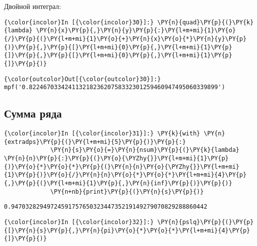 Двойной интеграл:

    \begin{Verbatim}[commandchars=\\\{\}]
{\color{incolor}In [{\color{incolor}30}]:} \PY{n}{quad}\PY{p}{(}\PY{k}{lambda} \PY{n}{x}\PY{p}{,}\PY{n}{y}\PY{p}{:}\PY{l+m+mi}{1}\PY{o}{/}\PY{p}{(}\PY{l+m+mi}{1}\PY{o}{+}\PY{n}{x}\PY{o}{*}\PY{n}{y}\PY{p}{)}\PY{p}{,}\PY{p}{[}\PY{l+m+mi}{0}\PY{p}{,}\PY{l+m+mi}{1}\PY{p}{]}\PY{p}{,}\PY{p}{[}\PY{l+m+mi}{0}\PY{p}{,}\PY{l+m+mi}{1}\PY{p}{]}\PY{p}{)}
\end{Verbatim}

            \begin{Verbatim}[commandchars=\\\{\}]
{\color{outcolor}Out[{\color{outcolor}30}]:} mpf('0.82246703342411321823620758332301259460947495060339899')
\end{Verbatim}
        
\subsection{Сумма ряда}
\label{mpmath6}

    \begin{Verbatim}[commandchars=\\\{\}]
{\color{incolor}In [{\color{incolor}31}]:} \PY{k}{with} \PY{n}{extradps}\PY{p}{(}\PY{l+m+mi}{5}\PY{p}{)}\PY{p}{:}
             \PY{n}{s}\PY{o}{=}\PY{n}{nsum}\PY{p}{(}\PY{k}{lambda} \PY{n}{n}\PY{p}{:}\PY{p}{(}\PY{o}{\PYZhy{}}\PY{l+m+mi}{1}\PY{p}{)}\PY{o}{*}\PY{o}{*}\PY{p}{(}\PY{n}{n}\PY{o}{\PYZhy{}}\PY{l+m+mi}{1}\PY{p}{)}\PY{o}{/}\PY{n}{n}\PY{o}{*}\PY{o}{*}\PY{l+m+mi}{4}\PY{p}{,}\PY{p}{(}\PY{l+m+mi}{1}\PY{p}{,}\PY{n}{inf}\PY{p}{)}\PY{p}{)}
             \PY{n+nb}{print}\PY{p}{(}\PY{n}{s}\PY{p}{)}
\end{Verbatim}

    \begin{Verbatim}[commandchars=\\\{\}]
0.9470328294972459175765032344735219149279070829288860442

    \end{Verbatim}

    \begin{Verbatim}[commandchars=\\\{\}]
{\color{incolor}In [{\color{incolor}32}]:} \PY{n}{pslq}\PY{p}{(}\PY{p}{[}\PY{n}{s}\PY{p}{,}\PY{n}{pi}\PY{o}{*}\PY{o}{*}\PY{l+m+mi}{4}\PY{p}{]}\PY{p}{)}
\end{Verbatim}

